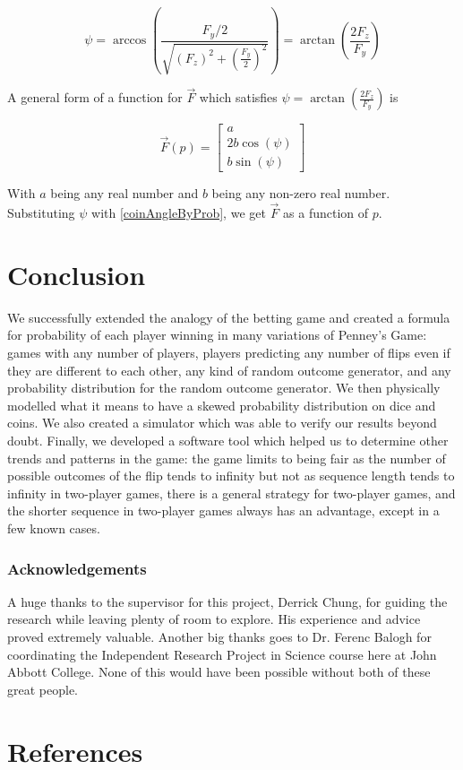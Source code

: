 \documentclass[english,12pt,a4paper,final]{article}
\begin{document}
\begin{equation*}
	\psi = \arccos \left(\frac{F_y/2}{\sqrt{(F_z)^2+(\frac{F_y}{2})^2}}\right) = \arctan\left(\frac{2F_z}{F_y}\right)
\end{equation*}

A general form of a function for $\vec{F}$ which satisfies $\psi = \arctan\left(\frac{2F_z}{F_y}\right)$ is

\begin{equation*}
	\vec{F}(p) = \begin{bmatrix}a\\2b\cos\left(\psi\right)\\b\sin\left(\psi\right)\end{bmatrix}
\end{equation*}

With $a$ being any real number and $b$ being any non-zero real number. Substituting $\psi$ with \eqref{coinAngleByProb}, we get $\vec{F}$ as a function of $p$.

\part {Conclusion}

We successfully extended the analogy of the betting game and created a formula for probability of each player winning in many variations of Penney's Game: games with any number of players, players predicting any number of flips even if they are different to each other, any kind of random outcome generator, and any probability distribution for the random outcome generator. We then physically modelled what it means to have a skewed probability distribution on dice and coins. We also created a simulator which was able to verify our results beyond doubt. Finally, we developed a software tool which helped us to determine other trends and patterns in the game: the game limits to being fair as the number of possible outcomes of the flip tends to infinity but not as sequence length tends to infinity in two-player games, there is a general strategy for two-player games, and the shorter sequence in two-player games always has an advantage, except in a few known cases.

\section{Acknowledgements}

A huge thanks to the supervisor for this project, Derrick Chung, for guiding the research while leaving plenty of room to explore. His experience and advice proved extremely valuable. Another big thanks goes to Dr. Ferenc Balogh for coordinating the Independent Research Project in Science course here at John Abbott College. None of this would have been possible without both of these great people.

\part {References}
\printbibliography[heading=none]
\end{document}
